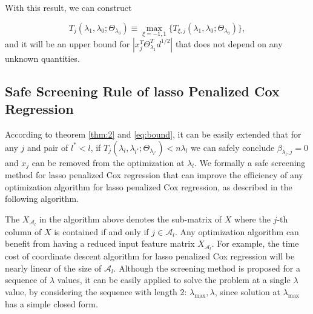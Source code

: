 With this result, we can construct

\begin{equation}
    \label{eq:bound}
    T_j(\lambda_1,\lambda_0;\Theta_{\lambda_0})\equiv\max_{\xi=-1,1}\{T_{\xi,j}(\lambda_1,\lambda_0;\Theta_{\lambda_0})\},
\end{equation}
and it will be an upper bound for $|x_j^T\Theta^T_{\lambda_1}d^{1/2}|$ that does not depend on any unknown quantities. 

\subsection{Safe Screening Rule of lasso Penalized Cox Regression}

According to theorem \ref{thm:2} and \eqref{eq:bound}, it can be easily extended that for any $j$ and pair of $l^*<l$, if $T_j(\lambda_{l},\lambda_{l^*};\Theta_{\lambda_{l^*}})<n\lambda_l$ we can safely conclude $\beta_{\lambda_l,j}=0$ and $x_j$ can be removed from the optimization at $\lambda_l$. We formally a safe screening method for lasso penalized Cox regression that can improve the efficiency of any optimization algorithm for lasso penalized Cox regression, as described in the following algorithm. 

\begin{algorithm}[H]

    
\end{algorithm}

The $X_{\mathcal{A}_l}$ in the algorithm above denotes the sub-matrix of $X$ where the $j$-th column of $X$ is contained if and only if $j\in{\mathcal{A}_l}$. Any optimization algorithm can benefit from having a reduced input feature matrix $X_{\mathcal{A}_l}$. For example, the time cost of coordinate descent algorithm for lasso penalized Cox regression \citep{simon2011regularization} will be nearly linear of the size of $\mathcal{A}_l$. Although the screening method is proposed for a sequence of $\lambda$ values, it can be easily applied to solve the problem at a single $\lambda$ value, by considering the sequence with length 2: $\lambda_{\max},\lambda$, since solution at $\lambda_{\max}$ has a simple closed form.

